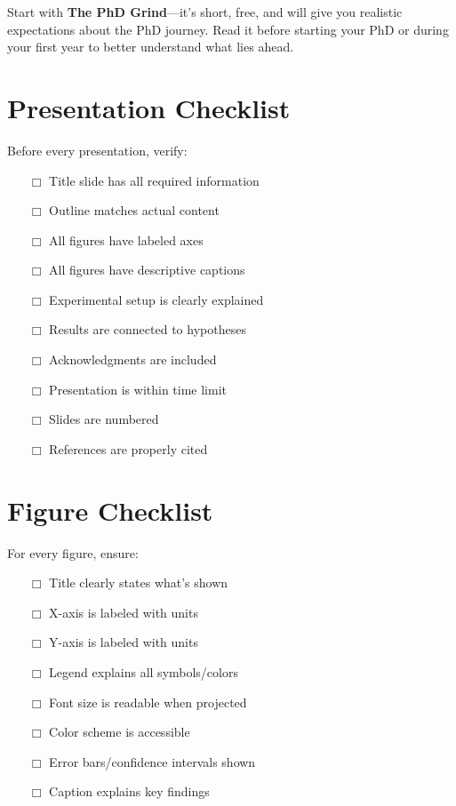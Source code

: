 \documentclass[11pt,a4paper]{article}
\begin{document}
\begin{tcolorbox}[colback=yellow!10,colframe=red!50,title=Reading Recommendation]
Start with \textbf{The PhD Grind}—it's short, free, and will give you realistic expectations about the PhD journey. Read it before starting your PhD or during your first year to better understand what lies ahead.
\end{tcolorbox}

\appendix

\newpage

\section{Presentation Checklist}

Before every presentation, verify:

\begin{itemize}
    \item[$\Box$] Title slide has all required information
    \item[$\Box$] Outline matches actual content
    \item[$\Box$] All figures have labeled axes
    \item[$\Box$] All figures have descriptive captions
    \item[$\Box$] Experimental setup is clearly explained
    \item[$\Box$] Results are connected to hypotheses
    \item[$\Box$] Acknowledgments are included
    \item[$\Box$] Presentation is within time limit
    \item[$\Box$] Slides are numbered
    \item[$\Box$] References are properly cited
\end{itemize}

\section{Figure Checklist}

For every figure, ensure:

\begin{itemize}
    \item[$\Box$] Title clearly states what's shown
    \item[$\Box$] X-axis is labeled with units
    \item[$\Box$] Y-axis is labeled with units
    \item[$\Box$] Legend explains all symbols/colors
    \item[$\Box$] Font size is readable when projected
    \item[$\Box$] Color scheme is accessible
    \item[$\Box$] Error bars/confidence intervals shown
    \item[$\Box$] Caption explains key findings
\end{itemize}
\end{document}
